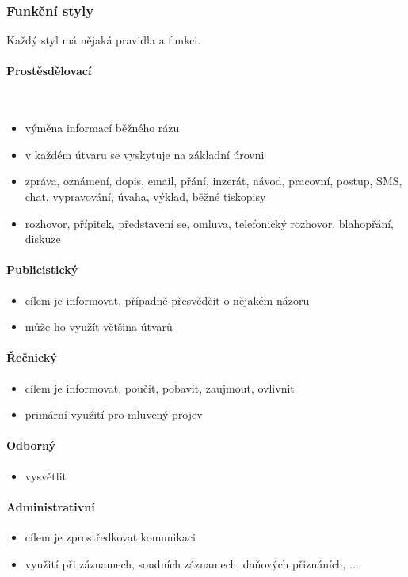 \documentclass[10pt,a4paper]{article}
\begin{document}
\subsubsection{Funkční styly}
Každý styl má nějaká pravidla a funkci.
\paragraph{Prostěsdělovací}\mbox{}\\
\begin{itemize}
\item výměna informací běžného rázu
\item v každém útvaru se vyskytuje na základní úrovni
\item zpráva, oznámení, dopis, email, přání, inzerát, návod, pracovní, postup, SMS, chat, vypravování, úvaha, výklad, běžné tiskopisy
\item rozhovor, přípitek, představení se, omluva, telefonický rozhovor, blahopřání, diskuze
\end{itemize}

\paragraph{Publicistický}
\begin{itemize}
\item cílem je informovat, případně přesvědčit o nějakém názoru
\item může ho využít většina útvarů
\end{itemize}

\paragraph{Řečnický}
\begin{itemize}
\item cílem je informovat, poučit, pobavit, zaujmout, ovlivnit
\item primární využití pro mluvený projev
\end{itemize}

\paragraph{Odborný}
\begin{itemize}
\item vysvětlit
\end{itemize}

\paragraph{Administrativní}
\begin{itemize}
\item cílem je zprostředkovat komunikaci
\item využití při záznamech, soudních záznamech, daňových přiznáních, ...
\end{itemize}
\end{document}
